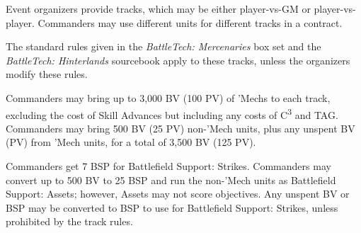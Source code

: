 Event organizers provide tracks, which may be either player-vs-GM or player-vs-player.
Commanders may use different units for different tracks in a contract.

The standard rules given in the \emph{BattleTech: Mercenaries} box set and the \emph{BattleTech: Hinterlands} sourcebook apply to these tracks, unless the organizers modify these rules.

Commanders may bring up to 3,000 BV (100 PV) of 'Mechs to each track, excluding the cost of Skill Advances but including any costs of C\textsuperscript{3} and TAG.
Commanders may bring 500 BV (25 PV) non-'Mech units, plus any unspent BV (PV) from 'Mech units, for a total of 3,500 BV (125 PV).

Commanders get 7 BSP for Battlefield Support: Strikes.
Commanders may convert up to 500 BV to 25 BSP and run the non-'Mech units as Battlefield Support: Assets; however, Assets may not score objectives.
Any unspent BV or BSP may be converted to BSP to use for Battlefield Support: Strikes, unless prohibited by the track rules.
